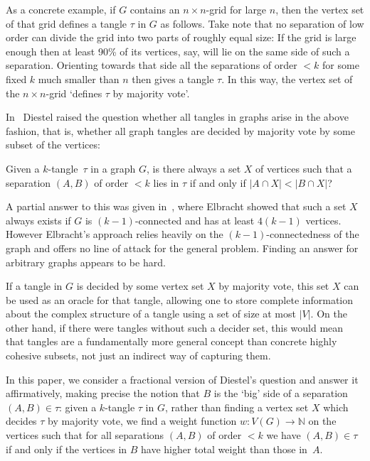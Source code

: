 \documentclass[11pt]{article}
\theoremstyle{definition}
\newcommand{\N}{\mathbb{N}}
\newcommand{\abs}[1]{\left |#1\right |}
\begin{document}
As a concrete example, if $ G $ contains an $ n\times n $-grid for large $ n $, then the vertex set of that grid defines a tangle $ \tau $ in $ G $ as follows.
Take note that no separation of low order can divide the grid into two parts of roughly equal size:
If the grid is large enough then at least 90\% of its vertices, say, will lie on the same side of such a separation.
Orienting towards that side all the separations of order $<k$ for some fixed $k$ much smaller than $n$ then gives a tangle $\tau$.
In this way, the vertex set of the $ n\times n $-grid `defines $ \tau $ by majority vote'.

In~\cite{ProfilesNew} Diestel raised the question whether all tangles in graphs arise in the above fashion, that is, whether all graph tangles are decided by majority vote by some subset of the vertices:
\begin{PROB}\label{prob:decider}
Given a $ k $-tangle~$ \tau $ in a graph $ G $, is there always a set $ X $ of vertices such that a separation $ (A,B) $ of order $ <k $ lies in $ \tau $ if and only if $ \abs{A\cap X}<\abs{B\cap X} $?
\end{PROB}
A partial answer to this was given in~\cite{ChristiansMasterarbeit}, where Elbracht showed that such a set $ X $ always exists if $ G $ is $ (k-1) $-connected and has at least $ 4(k-1) $ vertices. However Elbracht's approach relies heavily on the $ (k-1) $-connectedness of the graph and offers no line of attack for the general problem. Finding an answer for arbitrary graphs appears to be hard.

If a tangle in $ G $ is decided by some vertex set $ X $ by majority vote, this set $ X $ can be used as an oracle for that tangle, allowing one to store complete information about the complex structure of a tangle using a set of size at most $ \abs{V} $. On the other hand, if there were tangles without such a decider set, this would mean that tangles are a fundamentally more general concept than concrete highly cohesive subsets, not just an indirect way of capturing them.

In this paper, we consider a fractional version of Diestel's question and answer it affirmatively, making precise the notion that $ B $ is the `big' side of a separation $ (A,B)\in\tau $: given a $ k $-tangle $ \tau $ in $ G $, rather than finding a vertex set $ X $ which decides $ \tau $ by majority vote, we find a weight function $ w\colon V(G)\to\N $ on the vertices such that for all separations $ (A,B) $ of order $ <k $ we have $ (A,B)\in \tau $ if and only if the vertices in $ B $ have higher total weight than those in~$ A $.
\end{document}
